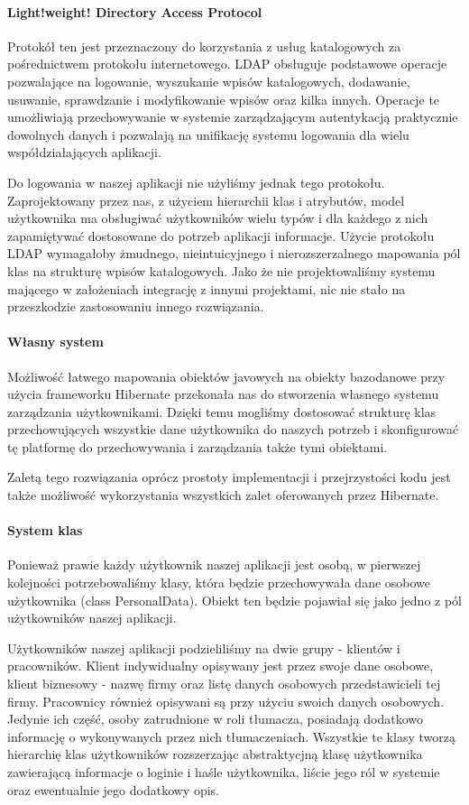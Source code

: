\documentclass[licencjacka]{pracamgr}
\begin{document}
\paragraph{Light!weight! Directory Access Protocol}
Protokół ten jest przeznaczony do korzystania z usług katalogowych za pośrednictwem protokołu internetowego. LDAP obsługuje podstawowe operacje pozwalające na logowanie, wyszukanie wpisów katalogowych, dodawanie, usuwanie, sprawdzanie i modyfikowanie wpisów oraz kilka innych. Operacje te umożliwiają przechowywanie w systemie zarządzającym autentykacją praktycznie dowolnych danych i pozwalają na unifikację systemu logowania dla wielu współdziałających aplikacji.

Do logowania w naszej aplikacji nie użyliśmy jednak tego protokołu. Zaprojektowany przez nas, z użyciem hierarchii klas i atrybutów, model użytkownika ma obsługiwać użytkowników wielu typów i dla każdego z nich zapamiętywać dostosowane do potrzeb aplikacji informacje. Użycie protokołu LDAP wymagałoby żmudnego, nieintuicyjnego i nierozszerzalnego mapowania pól klas na strukturę wpisów katalogowych. Jako że nie projektowaliśmy systemu mającego w założeniach integrację z innymi projektami, nic nie stało na przeszkodzie zastosowaniu innego rozwiązania.

\paragraph{Własny system}
Możliwość łatwego mapowania obiektów javowych na obiekty bazodanowe przy użycia frameworku Hibernate przekonała nas do stworzenia własnego systemu zarządzania użytkownikami. Dzięki temu mogliśmy dostosować strukturę klas przechowujących wszystkie dane użytkownika do naszych potrzeb i skonfigurować tę platformę do przechowywania i zarządzania także tymi obiektami.

Zaletą tego rozwiązania oprócz prostoty implementacji i przejrzystości kodu jest także możliwość wykorzystania wszystkich zalet oferowanych przez Hibernate.

\paragraph{System klas}
Ponieważ prawie każdy użytkownik naszej aplikacji jest osobą, w pierwszej kolejności potrzebowaliśmy klasy, która będzie przechowywała dane osobowe użytkownika (class PersonalData). Obiekt ten będzie pojawiał się jako jedno z pól użytkowników naszej aplikacji.

Użytkowników naszej aplikacji podzieliliśmy na dwie grupy - klientów i pracowników. Klient indywidualny opisywany jest przez swoje dane osobowe, klient biznesowy - nazwę firmy oraz listę danych osobowych przedstawicieli tej firmy. Pracownicy również opisywani są przy użyciu swoich danych osobowych. Jedynie ich część, osoby zatrudnione w roli tłumacza, posiadają dodatkowo informację o wykonywanych przez nich tłumaczeniach.
Wszystkie te klasy tworzą hierarchię klas użytkowników rozszerzając abstraktycjną klasę użytkownika zawierającą informacje o loginie i haśle użytkownika, liście jego ról w systemie oraz ewentualnie jego dodatkowy opis.
\end{document}
